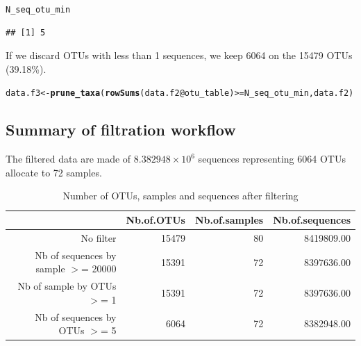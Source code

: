 \documentclass[12pt]{article}\usepackage[]{graphicx}\usepackage[]{color}
\makeatletter
\newcommand{\hlopt}[1]{\textcolor[rgb]{0,0,0}{#1}}%
\newcommand{\hlstd}[1]{\textcolor[rgb]{0.345,0.345,0.345}{#1}}%
\newcommand{\hlkwb}[1]{\textcolor[rgb]{0.69,0.353,0.396}{#1}}%
\newcommand{\hlkwc}[1]{\textcolor[rgb]{0.333,0.667,0.333}{#1}}%
\newcommand{\hlkwd}[1]{\textcolor[rgb]{0.737,0.353,0.396}{\textbf{#1}}}%
\newenvironment{kframe}{%
 \def\at@end@of@kframe{}%
 \ifinner\ifhmode%
  \def\at@end@of@kframe{\end{minipage}}%
  \begin{minipage}{\columnwidth}%
 \fi\fi%
 \def\FrameCommand##1{\hskip\@totalleftmargin \hskip-\fboxsep
 \colorbox{shadecolor}{##1}\hskip-\fboxsep
     \hskip-\linewidth \hskip-\@totalleftmargin \hskip\columnwidth}%
 \MakeFramed {\advance\hsize-\width
   \@totalleftmargin\z@ \linewidth\hsize
   \@setminipage}}%
 {\par\unskip\endMakeFramed%
 \at@end@of@kframe}
\newenvironment{knitrout}{}{} %
\numberwithin{figure}{section}
\makeatother
\begin{document}
\begin{knitrout}\small
{}\color{fgcolor}\begin{kframe}
\begin{alltt}
\hlstd{N_seq_otu_min}
\end{alltt}
\begin{verbatim}
## [1] 5
\end{verbatim}
\end{kframe}
\end{knitrout}

If we discard OTUs with less than 1 sequences, we keep 6064 on the 15479 OTUs (39.18\%).

\begin{knitrout}\small
{}\color{fgcolor}\begin{kframe}
\begin{alltt}
\hlstd{data.f3} \hlkwb{<-} \hlkwd{prune_taxa}\hlstd{(}\hlkwd{rowSums}\hlstd{(data.f2}\hlopt{@}\hlkwc{otu_table}\hlstd{)} \hlopt{>=} \hlstd{N_seq_otu_min, data.f2)}
\end{alltt}
\end{kframe}
\end{knitrout}

\subsection{Summary of filtration workflow}

The filtered data are made of \ensuremath{8.382948\times 10^{6}} sequences representing 6064 OTUs allocate to 72 samples.




\begin{table}[ht]
\centering
\begin{tabular}{rrrr}
  \hline
 & Nb.of.OTUs & Nb.of.samples & Nb.of.sequences \\ 
  \hline
No filter & 15479 &  80 & 8419809.00 \\ 
  Nb of sequences by sample $>$=  20000 & 15391 &  72 & 8397636.00 \\ 
  Nb of sample by OTUs $>$=  1 & 15391 &  72 & 8397636.00 \\ 
  Nb of sequences by OTUs $>$=  5 & 6064 &  72 & 8382948.00 \\ 
   \hline
\end{tabular}
\caption{Number of OTUs, samples and sequences after filtering} 
\end{table}
\end{document}
